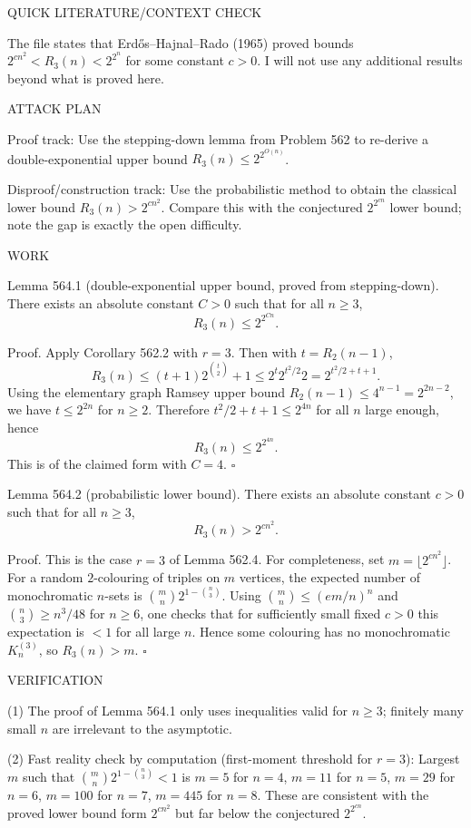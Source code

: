 QUICK LITERATURE/CONTEXT CHECK

The file states that Erd\H{o}s--Hajnal--Rado (1965) proved bounds
$2^{c n^2} < R_3(n) < 2^{2^{n}}$ for some constant $c>0$.
I will not use any additional results beyond what is proved here.

ATTACK PLAN

Proof track:
Use the stepping-down lemma from Problem 562 to re-derive a double-exponential upper bound $R_3(n)\le 2^{2^{O(n)}}$.

Disproof/construction track:
Use the probabilistic method to obtain the classical lower bound $R_3(n) > 2^{c n^2}$.
Compare this with the conjectured $2^{2^{c n}}$ lower bound; note the gap is exactly the open difficulty.

WORK

Lemma 564.1 (double-exponential upper bound, proved from stepping-down).
There exists an absolute constant $C>0$ such that for all $n\ge 3$,
\[
R_3(n) \le 2^{2^{C n}}.
\]

Proof.
Apply Corollary 562.2 with $r=3$. Then with $t=R_2(n-1)$,
\[
R_3(n) \le (t+1) 2^{\binom{t}{2}} + 1 \le 2^{t} 2^{t^2/2} 2 = 2^{t^2/2+t+1}.
\]
Using the elementary graph Ramsey upper bound $R_2(n-1)\le 4^{n-1}=2^{2n-2}$,
we have $t\le 2^{2n}$ for $n\ge 2$.
Therefore $t^2/2+t+1 \le 2^{4n}$ for all $n$ large enough, hence
\[
R_3(n) \le 2^{2^{4n}}.
\]
This is of the claimed form with $C=4$. \hfill$\square$

Lemma 564.2 (probabilistic lower bound).
There exists an absolute constant $c>0$ such that for all $n\ge 3$,
\[
R_3(n) > 2^{c n^2}.
\]

Proof.
This is the case $r=3$ of Lemma 562.4. For completeness, set $m=\lfloor 2^{c n^2}\rfloor$.
For a random $2$-colouring of triples on $m$ vertices, the expected number of monochromatic $n$-sets is
$\binom{m}{n}2^{1-\binom{n}{3}}$.
Using $\binom{m}{n}\le (em/n)^n$ and $\binom{n}{3}\ge n^3/48$ for $n\ge 6$, one checks that for sufficiently small fixed $c>0$ this expectation is $<1$ for all large $n$.
Hence some colouring has no monochromatic $K_n^{(3)}$, so $R_3(n)>m$. \hfill$\square$

VERIFICATION

(1) The proof of Lemma 564.1 only uses inequalities valid for $n\ge 3$; finitely many small $n$ are irrelevant to the asymptotic.

(2) Fast reality check by computation (first-moment threshold for $r=3$):
Largest $m$ such that $\binom{m}{n}2^{1-\binom{n}{3}}<1$ is
$m=5$ for $n=4$, $m=11$ for $n=5$, $m=29$ for $n=6$, $m=100$ for $n=7$, $m=445$ for $n=8$.
These are consistent with the proved lower bound form $2^{c n^2}$ but far below the conjectured $2^{2^{c n}}$.

